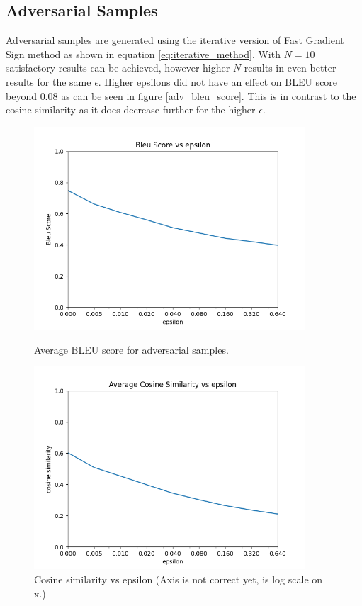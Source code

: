 \subsection*{Adversarial Samples}
Adversarial samples are generated using the iterative version of Fast Gradient Sign method as shown in equation \ref{eq:iterative_method}. With $N=10$ satisfactory results can be achieved, however higher $N$ results in even better results for the same $\epsilon$. Higher epsilons did not have an effect on BLEU score beyond $0.08$ as can be seen in figure \ref{adv_bleu_score}. This is in contrast to the cosine similarity as it does decrease further for the higher $\epsilon$.

\begin{figure}[h]
    \centering
    \begin{minipage}{0.45\textwidth}
        \centering
        \includegraphics[width=0.9\textwidth]{figures/adversarial_average_bleu_score.png} %
        \caption{Average BLEU score for adversarial samples.}
        \label{adv_bleu_score}
    \end{minipage}\hfill
    \begin{minipage}{0.45\textwidth}
        \centering
        \includegraphics[width=0.9\textwidth]{figures/adversarial_average_cosine_sim.png} %
        \caption{Cosine similarity vs epsilon (Axis is not correct yet, is log scale on x.)}
        \label{adv_cosine_similarity}
    \end{minipage}
\end{figure}

